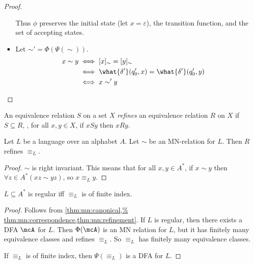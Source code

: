 \begin{proof}
\begin{itemize}
        Thus $\phi$ preserves the initial state (let $x = \varepsilon$), the
        transition function, and the set of accepting states.
        \item Let ${\sim'} = \Phi(\Psi({\sim}))$.
        \begin{align*}
            x \sim y &\iff [x]_{\sim} = [y]_{\sim} \\
            &\iff \what{\delta'}(q'_0, x) = \what{\delta'}(q'_0, y) \\
            &\iff x \sim' y \qedhere
        \end{align*}
    \end{itemize}
\end{proof}

\begin{definition}[Refinement] \label{def:eq:refinement}
    An equivalence relation $S$ on a set $X$ \emph{refines} an equivalence
    relation $R$ on $X$ if $S \subseteq R$, \ie, for all $x, y \in X$,
    if $xSy$ then $xRy$.
\end{definition}

\begin{lemma} \label{thm:mn:refinement}
    Let $L$ be a language over an alphabet $A$.
    Let $\sim$ be an MN-relation for $L$.
    Then $R$ refines $\equiv_L$.
\end{lemma}
\begin{proof}
    $\sim$ is right invariant.
    This means that for all $x, y \in A^*$, if $x \sim y$ then
    $\forall z \in A^* (xz \sim yz)$, so $x \equiv_L y$.
\end{proof}

\begin{theorem} \label{thm:mn:mn}
    $L \subseteq A^*$ is regular iff $\equiv_L$ is of finite index.
\end{theorem}
\begin{proof}
    Follows from \cref{thm:mn:canonical,%
    thm:mn:correspondence,thm:mn:refinement}.
    If $L$ is regular, then there exists a DFA $\mcA$ for $L$.
    Then $\Phi(\mcA)$ is an MN relation for $L$, but it has finitely many
    equivalence classes and refines $\equiv_L$.
    So $\equiv_L$ has finitely many equivalence classes.

    If $\equiv_L$ is of finite index, then $\Psi(\equiv_L)$ is a DFA for
    $L$.
\end{proof}
